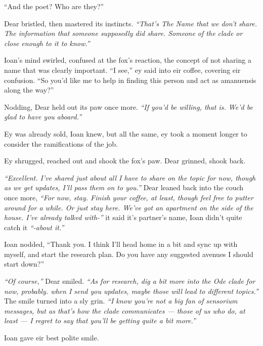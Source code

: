 ``And the poet? Who are they?''

Dear bristled, then mastered its instincts. \emph{``That's The Name that we don't share. The information that someone supposedly did share. Someone of the clade or close enough to it to know.''}

Ioan's mind swirled, confused at the fox's reaction, the concept of not sharing a name that was clearly important. ``I see,'' ey said into eir coffee, covering eir confusion. ``So you'd like me to help in finding this person and act as amanuensis along the way?''

Nodding, Dear held out its paw once more. \emph{``If you'd be willing, that is. We'd be glad to have you aboard.''}

Ey was already sold, Ioan knew, but all the same, ey took a moment longer to consider the ramifications of the job.

Ey shrugged, reached out and shook the fox's paw. Dear grinned, shook back.

\emph{``Excellent. I've shared just about all I have to share on the topic for now, though as we get updates, I'll pass them on to you.''} Dear leaned back into the couch once more, \emph{``For now, stay. Finish your coffee, at least, though feel free to putter around for a while. Or just stay here. We've got an apartment on the side of the house. I've already talked with-''} it said it's partner's name, Ioan didn't quite catch it \emph{``-about it.''}

Ioan nodded, ``Thank you. I think I'll head home in a bit and sync up with myself, and start the research plan. Do you have any suggested avenues I should start down?''

\emph{``Of course,''} Dear smiled. \emph{``As for research, dig a bit more into the Ode clade for now, probably. when I send you updates, maybe those will lead to different topics.''} The smile turned into a sly grin. \emph{``I know you're not a big fan of sensorium messages, but as that's how the clade communicates --- those of us who do, at least --- I regret to say that you'll be getting quite a bit more.''}

Ioan gave eir best polite smile.
